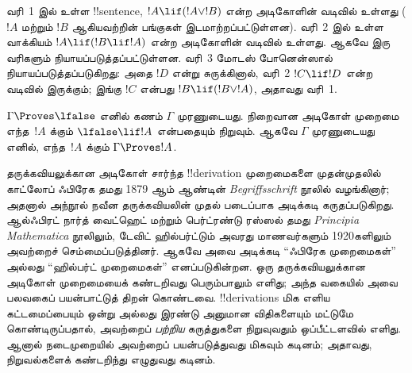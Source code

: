 \documentclass[../../../include/open-logic-section]{subfiles}
\begin{document}
வரி~1 இல் உள்ள !!{sentence}, $!A \lif (!A \lor !B)$ என்ற அடிகோளின்
வடிவில் உள்ளது ($!A$ மற்றும் $!B$ ஆகியவற்றின் பங்குகள் இடமாற்றப்பட்டுள்ளன).
வரி~2 இல் உள்ள வாக்கியம் $!A \lif (!B \lif !A)$ என்ற அடிகோளின் வடிவில்
உள்ளது. ஆகவே இரு வரிகளும் நியாயப்படுத்தப்பட்டுள்ளன. வரி~3 மோடஸ்
போனென்ஸால் நியாயப்படுத்தப்படுகிறது: அதை $!D$ என்று சுருக்கினால், வரி~2
$!C \lif !D$ என்ற வடிவில் இருக்கும்; இங்கு $!C$ என்பது $!B \lif (!B
\lor !A)$, அதாவது வரி~1.

$\Gamma \Proves \lfalse$ எனில் கணம் $\Gamma$ முரணுடையது. நிறைவான
அடிகோள் முறைமை எந்த~$!A$ க்கும் $\lfalse \lif !A$ என்பதையும் நிறுவும்.
ஆகவே $\Gamma$ முரணுடையது எனில், எந்த~$!A$ க்கும் $\Gamma \Proves !A$.

தருக்கவியலுக்கான அடிகோள் சார்ந்த !!{derivation} முறைமைகளை முதன்முதலில்
காட்லோப் ஃபிரேக தமது 1879 ஆம் ஆண்டின் \emph{Begriffsschrift} நூலில்
வழங்கினார்; அதனால் அந்நூல் நவீன தருக்கவியலின் முதல் படைப்பாக அடிக்கடி
கருதப்படுகிறது. ஆல்ஃபிரட் நார்த் வைட்ஹெட் மற்றும் பெர்ட்ரண்டு ரஸ்ஸல் தமது
\emph{Principia Mathematica} நூலிலும், டேவிட் ஹில்பர்ட்டும் அவரது
மாணவர்களும் 1920களிலும் அவற்றைச் செம்மைப்படுத்தினர். ஆகவே அவை அடிக்கடி
``ஃபிரேக முறைமைகள்'' அல்லது ``ஹில்பர்ட் முறைமைகள்'' எனப்படுகின்றன.
ஒரு தருக்கவியலுக்கான அடிகோள் முறைமையைக் கண்டறிவது பெரும்பாலும் எளிது;
அந்த வகையில் அவை பலவகைப் பயன்பாட்டுத் திறன் கொண்டவை. !!{derivation}s
மிக எளிய கட்டமைப்பையும் ஒன்று அல்லது இரண்டு அனுமான விதிகளையும் மட்டுமே
கொண்டிருப்பதால், அவற்றைப் \emph{பற்றிய} கருத்துகளை நிறுவுவதும்
ஒப்பீட்டளவில் எளிது. ஆனால் நடைமுறையில் அவற்றைப் பயன்படுத்துவது மிகவும்
கடினம்; அதாவது, நிறுவல்களைக் கண்டறிந்து எழுதுவது கடினம்.
\end{document}
